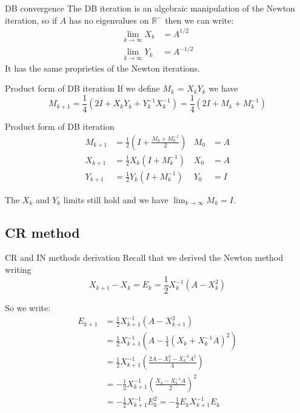 \documentclass{beamer}
\theoremstyle{plain}
\theoremstyle{definition}
\theoremstyle{remark}
\newcommand{\pa}[1]{\left(#1\right)}
\begin{document}
\begin{frame}{DB convergence}
  The DB iteration is an algebraic manipulation of the Newton
  iteration, so if $A$ has no eigenvalues on $\mathbb{R}^-$ then we
  can write:
  \begin{align*}
    \lim _{k \to \infty} X_k &= A^{1/2} \\
    \lim _{k\to \infty} Y_k &= A^{-1/2}
  \end{align*}  
  It has the same proprieties of the Newton iterations.
\end{frame}

\begin{frame}{Product form of DB iteration}
  If we define $M_k$ = $X_kY_k$ we have
  \[ M_{k+1} = \frac{1}{4}\pa{2 I + X_kY_k + Y_k^{-1}X_k^{-1}} =
    \frac{1}{4}\pa{2I + M_k + M_k^{-1}} \]
  \begin{block}{Product form of DB iteration}
    \begin{align*}
      M_{k+1} &= \frac{1}{2}\pa{ I + \frac{M_k + M_k^{-1}}{2}} & M_0 &=
                                                                      A
      \\
      X_{k+1} &= \frac{1}{2} X_k\pa{I+M_k^{-1}} & X_0 &= A \\
      Y_{k+1} &= \frac{1}{2} Y_k\pa{I+M_k^{-1}} & Y_0 &= I
    \end{align*}
  \end{block}
  The $X_k$ and $Y_k$ limits still hold and we have $\lim _{k\to
    \infty} M_k = I$.
\end{frame}

\subsection{CR method}

\begin{frame}{CR and IN methods derivation}
  Recall that we derived the Newton method writing
  \[ X_{k+1} - X_k = E_{k} = \frac{1}{2} X_k^{-1} \pa{A-X_k^2} \]
  
  So we write:
  \begin{align*}
    E_{k+1} &= \frac{1}{2}X_{k+1}^{-1}\pa{A-X_{k+1}^2} \\
    &= \frac{1}{2}X_{k+1}^{-1}\pa{A-\frac{1}{4}\pa{X_k +X_k^{-1}A}^2}
    \\
    &= \frac{1}{2}X_{k+1}^{-1}\pa{\frac{2A-X_k^2 -X_k^{-2}A^2}{4}} \\
    &= -\frac{1}{2}X_{k+1}^{-1}\pa{\frac{X_k - X_k^{-1}A}{2}}^2  \\
    &= -\frac{1}{2}X_{k+1}^{-1}E_k^2 = -\frac{1}{2}E_kX_{k+1}^{-1}E_k
  \end{align*}
\end{frame}
\end{document}
